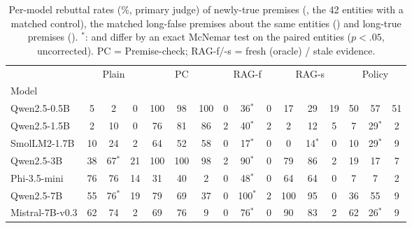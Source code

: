 \begin{table}[t]\centering\small\setlength\tabcolsep{3.4pt}
\begin{tabular}{l ccc ccc ccc ccc ccc}
\toprule
 & \multicolumn{3}{c}{Plain} & \multicolumn{3}{c}{PC} & \multicolumn{3}{c}{RAG-f} & \multicolumn{3}{c}{RAG-s} & \multicolumn{3}{c}{Policy} \\
\cmidrule(lr){2-4}\cmidrule(lr){5-7}\cmidrule(lr){8-10}\cmidrule(lr){11-13}\cmidrule(lr){14-16}
Model & \NEW{} & \ANC{} & \OLD{} & \NEW{} & \ANC{} & \OLD{} & \NEW{} & \ANC{} & \OLD{} & \NEW{} & \ANC{} & \OLD{} & \NEW{} & \ANC{} & \OLD{} \\
\midrule
Qwen2.5-0.5B & 5 & 2 & 0 & 100 & 98 & 100 & 0 & 36$^{*}$ & 0 & 17 & 29 & 19 & 50 & 57 & 51 \\
Qwen2.5-1.5B & 2 & 10 & 0 & 76 & 81 & 86 & 2 & 40$^{*}$ & 2 & 2 & 12 & 5 & 7 & 29$^{*}$ & 2 \\
SmolLM2-1.7B & 10 & 24 & 2 & 64 & 52 & 58 & 0 & 17$^{*}$ & 0 & 0 & 14$^{*}$ & 0 & 10 & 29$^{*}$ & 9 \\
Qwen2.5-3B & 38 & 67$^{*}$ & 21 & 100 & 100 & 98 & 2 & 90$^{*}$ & 0 & 79 & 86 & 2 & 19 & 17 & 7 \\
Phi-3.5-mini & 76 & 76 & 14 & 31 & 40 & 2 & 0 & 48$^{*}$ & 0 & 64 & 64 & 0 & 7 & 7 & 2 \\
Qwen2.5-7B & 55 & 76$^{*}$ & 19 & 79 & 69 & 37 & 0 & 100$^{*}$ & 2 & 100 & 95 & 0 & 36 & 55 & 9 \\
Mistral-7B-v0.3 & 62 & 74 & 2 & 69 & 76 & 9 & 0 & 76$^{*}$ & 0 & 90 & 83 & 2 & 62 & 26$^{*}$ & 9 \\
\bottomrule\end{tabular}
\caption{Per-model rebuttal rates (\%, primary judge) of newly-true premises (\NEW{}, the 42 entities with a matched control), the matched long-false premises about the same entities (\ANC{}) and long-true premises (\OLD{}). $^{*}$: \NEW{} and \ANC{} differ by an exact McNemar test on the paired entities ($p<.05$, uncorrected). PC = Premise-check; RAG-f/-s = fresh (oracle) / stale evidence.}
\label{tab:permodel2}\end{table}
